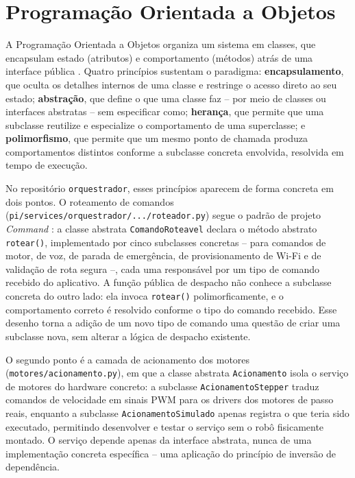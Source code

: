 \section{Programação Orientada a Objetos} \label{sec:poo}
A Programação Orientada a Objetos organiza um sistema em classes, que encapsulam estado (atributos) e comportamento (métodos) atrás de uma interface pública \cite{deitel2016}. Quatro princípios sustentam o paradigma: \textbf{encapsulamento}, que oculta os detalhes internos de uma classe e restringe o acesso direto ao seu estado; \textbf{abstração}, que define o que uma classe faz -- por meio de classes ou interfaces abstratas -- sem especificar como; \textbf{herança}, que permite que uma subclasse reutilize e especialize o comportamento de uma superclasse; e \textbf{polimorfismo}, que permite que um mesmo ponto de chamada produza comportamentos distintos conforme a subclasse concreta envolvida, resolvida em tempo de execução.

No repositório \texttt{orquestrador}, esses princípios aparecem de forma concreta em dois pontos. O roteamento de comandos (\texttt{pi/services/orquestrador/.../roteador.py}) segue o padrão de projeto \textit{Command} \cite{gamma2000}: a classe abstrata \texttt{ComandoRoteavel} declara o método abstrato \texttt{rotear()}, implementado por cinco subclasses concretas -- para comandos de motor, de voz, de parada de emergência, de provisionamento de Wi-Fi e de validação de rota segura --, cada uma responsável por um tipo de comando recebido do aplicativo. A função pública de despacho não conhece a subclasse concreta do outro lado: ela invoca \texttt{rotear()} polimorficamente, e o comportamento correto é resolvido conforme o tipo do comando recebido. Esse desenho torna a adição de um novo tipo de comando uma questão de criar uma subclasse nova, sem alterar a lógica de despacho existente.

O segundo ponto é a camada de acionamento dos motores (\texttt{motores/acionamento.py}), em que a classe abstrata \texttt{Acionamento} isola o serviço de motores do hardware concreto: a subclasse \texttt{AcionamentoStepper} traduz comandos de velocidade em sinais PWM para os drivers dos motores de passo reais, enquanto a subclasse \texttt{AcionamentoSimulado} apenas registra o que teria sido executado, permitindo desenvolver e testar o serviço sem o robô fisicamente montado. O serviço depende apenas da interface abstrata, nunca de uma implementação concreta específica -- uma aplicação do princípio de inversão de dependência.

